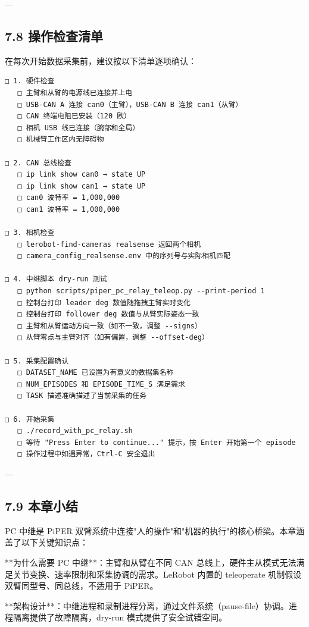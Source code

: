 \documentclass[UTF8,a4paper,11pt]{ctexart}
\begin{document}
{---

\subsection{7.8 操作检查清单}

在每次开始数据采集前，建议按以下清单逐项确认：

\begin{lstlisting}[language=text]
□ 1. 硬件检查
   □ 主臂和从臂的电源线已连接并上电
   □ USB-CAN A 连接 can0（主臂），USB-CAN B 连接 can1（从臂）
   □ CAN 终端电阻已安装（120 欧）
   □ 相机 USB 线已连接（腕部和全局）
   □ 机械臂工作区内无障碍物

□ 2. CAN 总线检查
   □ ip link show can0 → state UP
   □ ip link show can1 → state UP
   □ can0 波特率 = 1,000,000
   □ can1 波特率 = 1,000,000

□ 3. 相机检查
   □ lerobot-find-cameras realsense 返回两个相机
   □ camera_config_realsense.env 中的序列号与实际相机匹配

□ 4. 中继脚本 dry-run 测试
   □ python scripts/piper_pc_relay_teleop.py --print-period 1
   □ 控制台打印 leader deg 数值随拖拽主臂实时变化
   □ 控制台打印 follower deg 数值与从臂实际姿态一致
   □ 主臂和从臂运动方向一致（如不一致，调整 --signs）
   □ 从臂零点与主臂对齐（如有偏置，调整 --offset-deg）

□ 5. 采集配置确认
   □ DATASET_NAME 已设置为有意义的数据集名称
   □ NUM_EPISODES 和 EPISODE_TIME_S 满足需求
   □ TASK 描述准确描述了当前采集的任务

□ 6. 开始采集
   □ ./record_with_pc_relay.sh
   □ 等待 "Press Enter to continue..." 提示，按 Enter 开始第一个 episode
   □ 操作过程中如遇异常，Ctrl-C 安全退出
\end{lstlisting}

---

\subsection{7.9 本章小结}

PC 中继是 PiPER 双臂系统中连接"人的操作"和"机器的执行"的核心桥梁。本章涵盖了以下关键知识点：

\item[1] **为什么需要 PC 中继**：主臂和从臂在不同 CAN 总线上，硬件主从模式无法满足关节变换、速率限制和采集协调的需求。LeRobot 内置的 teleoperate 机制假设双臂同型号、同总线，不适用于 PiPER。

\item[2] **架构设计**：中继进程和录制进程分离，通过文件系统（pause-file）协调。进程隔离提供了故障隔离，dry-run 模式提供了安全试错空间。

}
\end{document}
